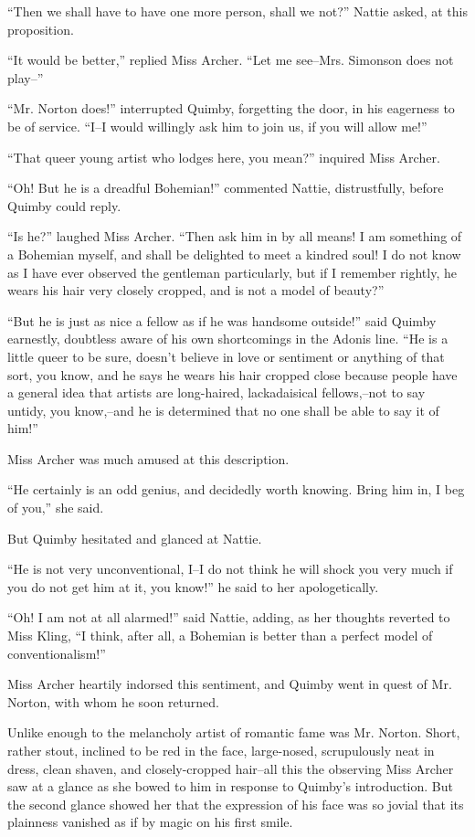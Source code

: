 ``Then we shall have to have one more person, shall we not?'' Nattie
asked, at this proposition.

``It would be better,'' replied Miss Archer. ``Let me see--Mrs. Simonson
does not play--''

``Mr. Norton does!'' interrupted Quimby, forgetting the door, in his
eagerness to be of service. ``I--I would willingly ask him to join us, if
you will allow me!''

``That queer young artist who lodges here, you mean?'' inquired Miss
Archer.

``Oh! But he is a dreadful Bohemian!'' commented Nattie, distrustfully,
before Quimby could reply.

``Is he?'' laughed Miss Archer. ``Then ask him in by all means! I am
something of a Bohemian myself, and shall be delighted to meet a kindred
soul! I do not know as I have ever observed the gentleman particularly,
but if I remember rightly, he wears his hair very closely cropped, and
is not a model of beauty?''

``But he is just as nice a fellow as if he was handsome outside!'' said
Quimby earnestly, doubtless aware of his own shortcomings in the Adonis
line. ``He is a little queer to be sure, doesn't believe in love or
sentiment or anything of that sort, you know, and he says he wears his
hair cropped close because people have a general idea that artists are
long-haired, lackadaisical fellows,--not to say untidy, you know,--and
he is determined that no one shall be able to say it of him!''

Miss Archer was much amused at this description.

``He certainly is an odd genius, and decidedly worth knowing. Bring him
in, I beg of you,'' she said.

But Quimby hesitated and glanced at Nattie.

``He is not very unconventional, I--I do not think he will shock you very
much if you do not get him at it, you know!'' he said to her
apologetically.

``Oh! I am not at all alarmed!'' said Nattie, adding, as her thoughts
reverted to Miss Kling, ``I think, after all, a Bohemian is better than a
perfect model of conventionalism!''

Miss Archer heartily indorsed this sentiment, and Quimby went in quest
of Mr. Norton, with whom he soon returned.

Unlike enough to the melancholy artist of romantic fame was Mr. Norton.
Short, rather stout, inclined to be red in the face, large-nosed,
scrupulously neat in dress, clean shaven, and closely-cropped hair--all
this the observing Miss Archer saw at a glance as she bowed to him in
response to Quimby's introduction. But the second glance showed her that
the expression of his face was so jovial that its plainness vanished as
if by magic on his first smile.

